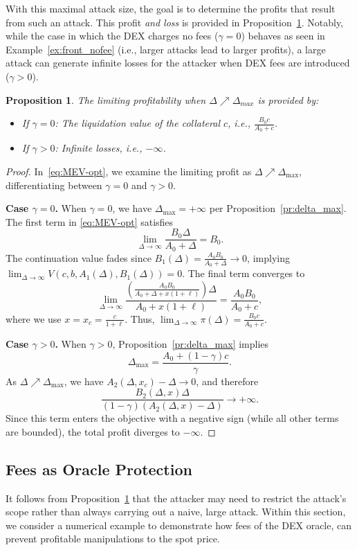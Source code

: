 \documentclass[11pt]{article} %
\newtheorem{proposition}[theorem]{Proposition}
\begin{document}
With this maximal attack size, the goal is to determine the profits that result from such an attack. This profit \emph{and loss} is provided in Proposition~\ref{pr:limit}. Notably, while the case in which the DEX charges no fees ($\gamma = 0$) behaves as seen in Example~\ref{ex:front_nofee} (i.e., larger attacks lead to larger profits), a large attack can generate infinite losses for the attacker when DEX fees are introduced ($\gamma > 0$).

\begin{proposition}\label{pr:limit}
The limiting profitability when $\Delta \nearrow \Delta_{max}$ is provided by:
\begin{itemize}
    \item If $\gamma = 0$: The liquidation value of the collateral $c$, i.e., $\frac{B_0 c}{A_0 + c}$.
    \item If $\gamma > 0$: Infinite losses, i.e., $-\infty$.
\end{itemize}
\end{proposition}

\begin{proof}
In~\eqref{eq:MEV-opt}, we examine the limiting profit as $\Delta \nearrow \Delta_{\max}$, differentiating between $\gamma=0$ and $\gamma>0$.

\noindent\textbf{Case $\gamma=0$.}
When $\gamma=0$, we have $\Delta_{\max}=+\infty$ per Proposition~\ref{pr:delta_max}. The first term in \eqref{eq:MEV-opt} satisfies
$$\lim_{\Delta\to\infty}\frac{B_0\Delta}{A_0+\Delta}=B_0.$$
The continuation value fades since $B_1(\Delta)=\frac{A_0B_0}{A_0+\Delta}\to 0$, implying
$\lim_{\Delta\to\infty}V(c,b,A_1(\Delta),B_1(\Delta))=0.$
The final term converges to
$$\lim_{\Delta\to\infty}\frac{\left(\frac{A_0B_0}{A_0+\Delta+x(1+\ell)}\right)\Delta}{A_0+x(1+\ell)}=\frac{A_0B_0}{A_0+c},$$
where we use $x=x_c=\frac{c}{1+\ell}$. Thus, $\lim_{\Delta\to\infty}\pi(\Delta)=\frac{B_0c}{A_0+c}.$

\noindent\textbf{Case $\gamma>0$.}
When $\gamma>0$, Proposition~\ref{pr:delta_max} implies
\[
\Delta_{\max}=\frac{A_0+(1-\gamma)c}{\gamma}.
\]
As $\Delta\nearrow\Delta_{\max}$, we have $A_2(\Delta,x_c)-\Delta\to 0$, and therefore
\[
\frac{B_2(\Delta,x)\Delta}{(1-\gamma)(A_2(\Delta,x)-\Delta)}\to+\infty.
\]
Since this term enters the objective with a negative sign (while all other terms are bounded), the total profit diverges to $-\infty$.
\end{proof}

\subsection{Fees as Oracle Protection}\label{sec:front-fees}
It follows from Proposition~\ref{pr:limit} that the attacker may need to restrict the attack's scope rather than always carrying out a naive, large attack. Within this section, we consider a numerical example to demonstrate how fees of the DEX oracle, can prevent profitable manipulations to the spot price. 
\end{document}
